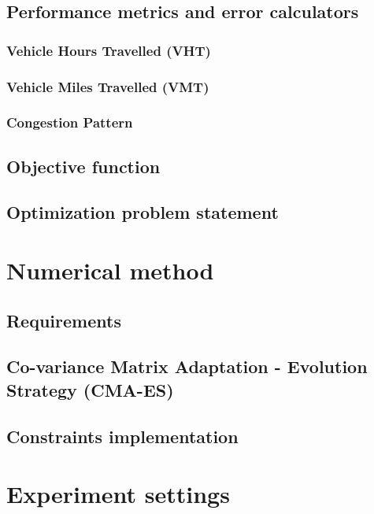 \subsection{Performance metrics and error calculators}
\label{subsec:pcs_intro}

\subsubsection{Vehicle Hours Travelled (VHT)}
\label{subsubsec:tvh}

\subsubsection{Vehicle Miles Travelled (VMT)}
\label{subsubsec:tvm}

\subsubsection{Congestion Pattern}
\label{subsubsec:cp}

\subsection{Objective function}
\label{subsec:fitnessintro}

\subsection{Optimization problem statement}
\label{subsec:statement}


\section{Numerical method}
\subsection{Requirements}
\label{subsec:requirements}

\subsection{Co-variance Matrix Adaptation - Evolution Strategy (CMA-ES)}
\label{subsec:cmaes}

\subsection{Constraints implementation}
\label{subsec:implementation}


\newpage
\section{Experiment settings}
\label{experiment_intro}

